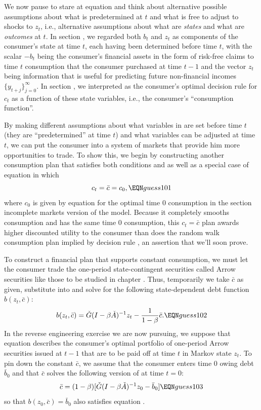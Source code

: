 We now pause to stare at equation  and  think about alternative possible assumptions about what is predetermined at $t$ and
what is free to adjust to shocks to $z_t$, i.e., alternative assumptions about what are {\it states\/}  and what are {\it outcomes\/} at $t$.
   In section , we regarded both $b_t$ and $z_t$ as components of the consumer's  state
at time $t$,  each having been determined before time $t$,  with the scalar $-b_t$  being the consumer's financial assets in the form
of risk-free claims to time $t$ consumption that the consumer purchased at time $t-1$ and the vector $z_t$ being information that is useful for predicting future non-financial
incomes $\{y_{t+j}\}_{j=0}^\infty$.  In section ,  we interpreted   as the  consumer's  optimal decision rule for  $c_t$ as a function of these
state variables,
i.e., the consumer's ``consumption function''.

By making different assumptions about what variables in   are set before time $t$ (they are  ``predetermined'' at time $t$)
and what variables can  be adjusted  at time $t$, we can put the consumer into a system of markets that provide him more opportunities
to trade. To show this, we begin by constructing another  consumption plan that satisfies both conditions  and  as well
as a special case of  equation  in which
$$ c_t = \bar c  = c_0 , \EQN guess101 $$
where  $c_0$ is given by equation   for  the  optimal time $0$ consumption
in the section   incomplete markets version of the model.    Because it  completely smooths consumption and has
the same time $0$ consumption,
this  $c_t = \bar c$ plan awards higher discounted utility to the consumer
than does  the random walk consumption plan
implied by decision rule , an assertion that we'll soon prove.

 To construct a financial plan that supports constant consumption, we must let the consumer trade the one-period state-contingent securities 
 called Arrow securities like those to be studied in chapter .  Thus,  temporarily we take $\bar c$ as given, substitute  into
 and solve for the following state-dependent debt function $b(z_t, \bar c)$:
$$ b(z_t, \bar c) =  \check G(I-\beta \check A)^{-1} z_t - {\frac{1}{1-\beta}} \bar c . \EQN guess102 $$
In the reverse engineering exercise we are now pursuing, we suppose that equation  describes the consumer's optimal portfolio
of one-period Arrow securities issued at $t-1$ that are to be paid off at time $t$ in Markov state $z_t$.
To pin down the constant $\bar c$, we assume that the consumer enters time $0$ owing debt $\bar b_0$ and that 
$\bar c$ solves  the following version of  at time $t=0$:
$$ \bar c = (1 -\beta) [ \check G(I-\beta \check A)^{-1} z_0 -  \bar b_0 ]  \EQN guess103 $$
so that $b(z_0, \bar c) = \bar b_0$ also satisfies equation .

